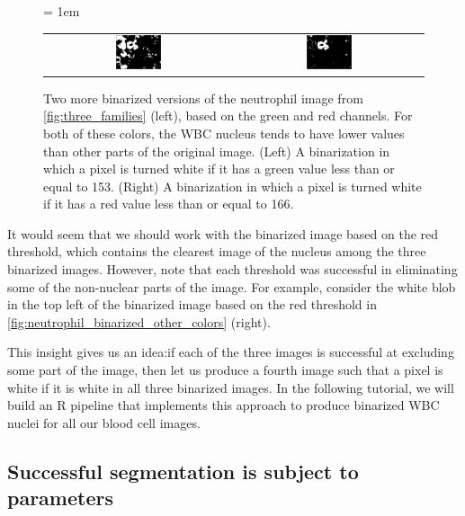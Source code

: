 \begin{figure}[h]
\centering
 \tabcolsep = 1em
\mySfFamily
\begin{tabular}{c c}
\includegraphics[width = 0.25\textwidth]{../images/neutrophil_binarized_green.png} & \includegraphics[width = 0.25\textwidth]{../images/neutrophil_binarized_red.png}
\end{tabular}
\caption{Two more binarized versions of the neutrophil image from \autoref{fig:three_families} (left), based on the green and red channels. For both of these colors, the WBC nucleus tends to have lower values than other parts of the original image. (Left) A binarization in which a pixel is turned white if it has a green value less than or equal to 153. (Right) A binarization in which a pixel is turned white if it has a red value less than or equal to 166.}
\label{fig:neutrophil_binarized_other_colors}
\end{figure}

It would seem that we should work with the binarized image based on the red threshold, which contains the clearest image of the nucleus among the three binarized images. However, note that each threshold was successful in eliminating some of the non-nuclear parts of the image. For example, consider the white blob in the top left of the binarized image based on the red threshold in \autoref{fig:neutrophil_binarized_other_colors} (right).

This insight gives us an idea: if each of the three images is successful at excluding some part of the image, then let us produce a fourth image such that a pixel is white if it is white in all three binarized images. In the following tutorial, we will build an R pipeline that implements this approach to produce binarized WBC nuclei for all our blood cell images.
\FloatBarrier
{}
\subsection{Successful segmentation is subject to parameters}


